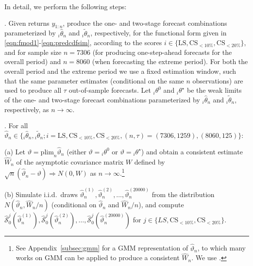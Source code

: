\documentclass[12pt]{article}
\theoremstyle{definition}
\theoremstyle{remark}
\renewcommand{\appendixname}{Appendix}
\begin{document}
In detail, we perform the following steps:

\smallskip

. Given returns $y_{1:n}$, produce the one- and two-stage forecast combinations parameterized by ${}_i \hat{\theta}_n$ and ${}_i \tilde{\theta}_n$, respectively, for the functional form given in \eqref{eqn:fmod1}-\eqref{eqn:predcdfsim}, according to the scores $i \in \{\mathrm{LS}, \mathrm{CS}_{<10\%}, \mathrm{CS}_{<20\%}\}$, and for sample size $n = 7306$ (for producing one-step-ahead forecasts for the overall period) and $n = 8060 $ (when forecasting the extreme period). For both the overall period and the extreme period we use a fixed estimation window, such that the same parameter estimates (conditional on the same $n$ observations) are used to produce all $\tau$ out-of-sample forecasts. Let ${}_i \theta^0$ and ${}_i \theta^{\star}$ be the weak limits of the one- and two-stage forecast combinations parameterized by ${}_i \hat{\theta}_n$ and ${}_i \tilde{\theta}_n$, respectively, as $n \to \infty$.

\smallskip

. For all $\hat{\vartheta}_n \in \{ {}_i \hat{\theta}_n, {}_i \tilde{\theta}_n ; i = \mathrm{LS}, \mathrm{CS}_{<10\%}, \mathrm{CS}_{<20\%}, (n, \tau) = (7306, 1259), (8060, 125)\}$:

\smallskip

\noindent (a) Let $\vartheta = \mathrm{plim}_n \hat{\vartheta}_n$ (either $\vartheta = {}_i \theta^0$ or $\vartheta = {}_i \theta^{\star}$) and obtain a consistent estimate $\hat{W}_n$ of the asymptotic covariance matrix $W$ defined by $\sqrt{n} (\hat{\vartheta}_n - \vartheta) \Rightarrow N(0, W)$ as $n \to \infty$.\footnote{See \appendixname\ \ref{subsec:gmm} for a GMM representation of $\hat{\vartheta}_n$, to which many works on GMM can be applied to produce a consistent $\hat{W}_n$. We use \cite{Andrews2002}.}

\smallskip

\noindent (b) Simulate i.i.d.\ draws $\hat{\vartheta}_n^{(1)}, \hat{\vartheta}_n^{(2)}, \ldots, \hat{\vartheta}_n^{(20000)}$ from the distribution $N(\hat{\vartheta}_n, \hat{W}_n/n)$ (conditional on $\hat{\vartheta}_n$ and $\hat{W}_n/n$), and compute $\hat{\mathcal{S}}^j_0(\hat{\vartheta}_n^{(1)}), \hat{\mathcal{S}}^j_0(\hat{\vartheta}_n^{(2)}), \ldots, \hat{\mathcal{S}}^j_0(\hat{\vartheta}_n^{(20000)})$ for $j \in \{LS,\allowbreak \mathrm{CS}_{<10\%},\allowbreak \mathrm{CS}_{<20\%}\}$.

\smallskip
\end{document}
